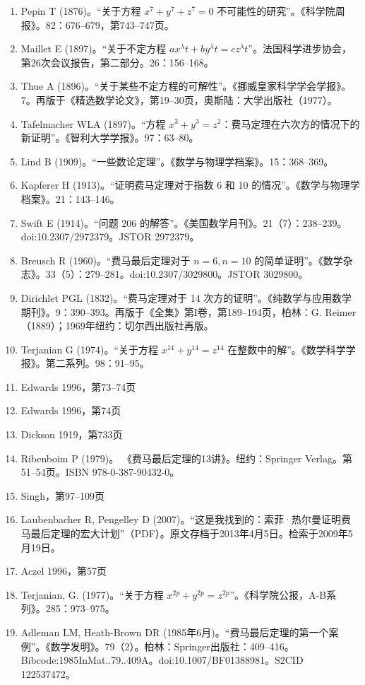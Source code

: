 \begin{enumerate}
\item Pepin T (1876)。“关于方程 \( x^7 + y^7 + z^7 = 0 \) 不可能性的研究”。《科学院周报》。82：676–679，第743–747页。  
\item Maillet E (1897)。“关于不定方程 \( ax^\lambda t + by^\lambda t = cz^\lambda t \)”。法国科学进步协会，第26次会议报告，第二部分。26：156–168。  
\item Thue A (1896)。“关于某些不定方程的可解性”。《挪威皇家科学学会学报》。7。再版于《精选数学论文》，第19–30页，奥斯陆：大学出版社（1977）。  
\item Tafelmacher WLA (1897)。“方程 \( x^3 + y^3 = z^2 \)：费马定理在六次方的情况下的新证明”。《智利大学学报》。97：63–80。
\item Lind B (1909)。“一些数论定理”。《数学与物理学档案》。15：368–369。  
\item Kapferer H (1913)。“证明费马定理对于指数 6 和 10 的情况”。《数学与物理学档案》。21：143–146。  
\item Swift E (1914)。“问题 206 的解答”。《美国数学月刊》。21（7）：238–239。doi:10.2307/2972379。JSTOR 2972379。  
\item Breusch R (1960)。“费马最后定理对于 \( n = 6, n = 10 \) 的简单证明”。《数学杂志》。33（5）：279–281。doi:10.2307/3029800。JSTOR 3029800。  
\item Dirichlet PGL (1832)。“费马定理对于 14 次方的证明”。《纯数学与应用数学期刊》。9：390–393。再版于《全集》第I卷，第189–194页，柏林：G. Reimer（1889）；1969年纽约：切尔西出版社再版。  
\item Terjanian G (1974)。“关于方程 \( x^{14} + y^{14} = z^{14} \) 在整数中的解”。《数学科学学报》。第二系列。98：91–95。  
\item Edwards 1996，第73–74页  
\item Edwards 1996，第74页  
\item Dickson 1919，第733页  
\item Ribenboim P (1979)。 《费马最后定理的13讲》。纽约：Springer Verlag。第51–54页。ISBN 978-0-387-90432-0。  
\item Singh，第97–109页
\item Laubenbacher R, Pengelley D (2007)。“这是我找到的：索菲·热尔曼证明费马最后定理的宏大计划”（PDF）。原文存档于2013年4月5日。检索于2009年5月19日。  
\item Aczel 1996，第57页  
\item Terjanian, G. (1977)。“关于方程 \( x^{2p} + y^{2p} = z^{2p} \)”。《科学院公报，A-B系列》。285：973–975。  
\item Adleman LM, Heath-Brown DR (1985年6月)。“费马最后定理的第一个案例”。《数学发明》。79（2）。柏林：Springer出版社：409–416。Bibcode:1985InMat..79..409A。doi:10.1007/BF01388981。S2CID 122537472。  

\end{enumerate}
